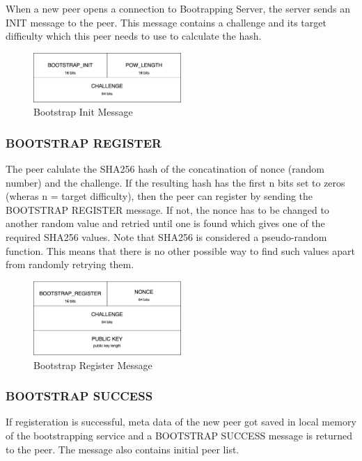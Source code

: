 When a new peer opens a connection to Bootrapping Server, the server sends an INIT message to the peer. This message contains a challenge and its target difficulty which this peer needs to use to calculate the hash.

\begin{figure}[H]
    \centering
    \includegraphics[width=0.5\textwidth]{pics/bootstrap.init.png}
    \caption{Bootstrap Init Message}
\end{figure}

\subsubsection{BOOTSTRAP REGISTER}

The peer calulate the SHA256 hash of the concatination of nonce (random number) and the challenge. If the resulting hash has the first n bits set to zeros (wheras n = target difficulty), then the peer can register by sending the BOOTSTRAP REGISTER message. If not, the nonce has to be changed to another random value and retried until one is found which gives one of the required SHA256 values. Note that SHA256 is considered a pseudo-random function. This means that there is no other possible way to find such values apart from randomly retrying them.

\begin{figure}[H]
    \centering
    \includegraphics[width=0.5\textwidth]{pics/bootstrap.register.png}
    \caption{Bootstrap Register Message}
\end{figure}

\subsubsection{BOOTSTRAP SUCCESS}

If registeration is successful, meta data of the new peer got saved in local memory of the bootstrapping service and a BOOTSTRAP SUCCESS message is returned to the peer. The message also contains initial peer list.

